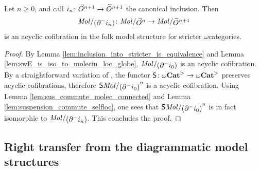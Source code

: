 \begin{prop} \label{prop:walking_eq_of_dim_n}
    Let \( n \geq 0 \), and call \( i_n \colon \vec{O}^{n + 1} \to \widetilde{O}^{n + 1} \) the canonical inclusion.
    Then 
    \begin{equation*}
        \molecin{(\bd{}{-} i_n)} \colon \molecin{\dglobe{n}} \to \molecin{\rglobe{n + 1}} 
    \end{equation*}
    is an acyclic cofibration in the folk model structure for stricter \( \omega \)\nbd categories.
\end{prop}
\begin{proof}
    By Lemma \ref{lem:inclusion_into_stricter_is_equivalence} and Lemma \ref{lem:swE_is_iso_to_molecin_loc_globe}, \( \molecin{(\bd{}{-} i_0)} \) is an acyclic cofibration.
    By a straightforward variation of \cite[Proposition 2.8]{hadzihasanovic2024model}, the functor \( \mathsf{S}{} \colon {\omega\mathbf{Cat}}^> \to {\omega\mathbf{Cat}}^> \) preserves acyclic cofibrations, therefore \( \sus{\molecin{(\bd{}{-} i_0)}}^n \) is a acyclic cofibration.
    Using Lemma \ref{lem:sus_commute_molec_connected} and Lemma \ref{lem:suspension_commute_selfloc}, one sees that \( \sus{\molecin{(\bd{}{-} i_0)}}^n \) is in fact isomorphic to \( \molecin{(\bd{}{-} i_n)} \).
    This concludes the proof.
\end{proof}

\subsection{Right transfer from the diagrammatic model structures}

